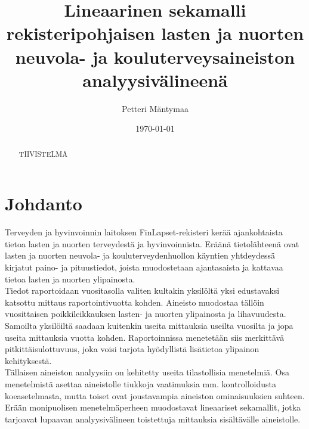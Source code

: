 \documentclass[finnish]{docopts}
\begin{document}
\singlespacing

\title{Lineaarinen sekamalli rekisteripohjaisen lasten ja nuorten neuvola- ja kouluterveysaineiston analyysivälineenä}
\author{Petteri Mäntymaa}
\date{\today}

\maketitle




\begin{abstract}

TIIVISTELMÄ

\end{abstract}

\mytableofcontents

\section{Johdanto}
\label{sec:johdanto}

Terveyden ja hyvinvoinnin laitoksen FinLapset-rekisteri \cite{finlapsetrekisteri} kerää ajankohtaista tietoa lasten ja nuorten terveydestä ja hyvinvoinnista. Eräänä tietolähteenä ovat lasten ja nuorten neuvola- ja kouluterveydenhuollon käyntien yhtdeydessä kirjatut paino- ja pituustiedot, joista muodostetaan ajantasaista ja kattavaa tietoa lasten ja nuorten ylipainosta.\\

Tiedot raportoidaan vuositasolla valiten kultakin yksilöltä yksi edustavaksi katsottu mittaus raportointivuotta kohden. Aineisto muodostaa tällöin vuosittaisen poikkileikkauksen lasten- ja nuorten ylipainosta ja lihavuudesta. Samoilta yksilöiltä saadaan kuitenkin useita mittauksia useilta vuosilta ja jopa useita mittauksia vuotta kohden. Raportoinnissa menetetään siis merkittävä pitkittäisulottuvuus, joka voisi tarjota hyödyllistä lisätietoa ylipainon kehityksestä.\\

Tällaisen aineiston analyysiin on kehitetty useita tilastollisia menetelmiä. Osa menetelmistä asettaa aineistolle tiukkoja vaatimuksia mm. kontrolloidusta koeasetelmasta, mutta toiset ovat joustavampia aineiston ominaisuuksien suhteen. Erään monipuolisen menetelmäperheen muodostavat lineaariset sekamallit, jotka tarjoavat lupaavan analyysivälineen toistettuja mittauksia sisältävälle aineistolle.\\
\end{document}
